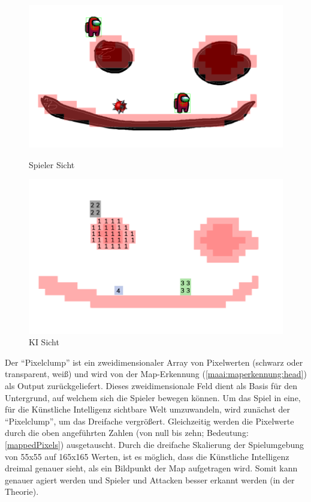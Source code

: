 \begin{figure}[H]
  \centering
  \begin{minipage}[t]{0.45\linewidth}
    \centering
    \includegraphics[width=\linewidth]{pics/ai/newView.png}
    \caption{Spieler Sicht}
    \label{maai:ai:newView}
  \end{minipage}
  \hfill
  \begin{minipage}[t]{0.45\linewidth}
    \centering
    \includegraphics[width=\linewidth]{pics/ai/KIView.png}
    \caption{KI Sicht}
    \label{maai:ai:KIView}
  \end{minipage}
\end{figure}

Der ``Pixelclump'' ist ein zweidimensionaler Array von Pixelwerten (schwarz oder transparent, weiß) und wird von der Map-Erkennung (\ref{maai:maperkennung:head}) als Output zurückgeliefert. Dieses zweidimensionale Feld dient als Basis für den Untergrund, auf welchem sich die Spieler bewegen können. Um das Spiel in eine, für die Künstliche Intelligenz sichtbare Welt umzuwandeln, wird zunächst der ``Pixelclump'', um das Dreifache vergrößert. Gleichzeitig werden die Pixelwerte durch die oben angeführten Zahlen (von null bis zehn; Bedeutung: \ref{mappedPixels}) ausgetauscht. Durch die dreifache Skalierung der Spielumgebung von 55x55 auf 165x165 Werten, ist es möglich, dass die Künstliche Intelligenz dreimal genauer sieht, als ein Bildpunkt der Map aufgetragen wird. Somit kann genauer agiert werden und Spieler und Attacken besser erkannt werden (in der Theorie).

